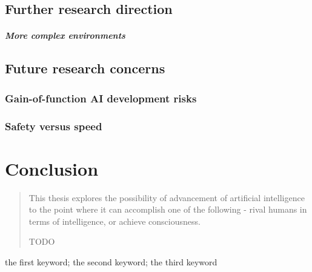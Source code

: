 \documentclass[masterthesis]{fer}
\begin{document}
\section{Further research direction}
\paragraph{More complex environments}
\section{Future research concerns}
\subsection{Gain-of-function AI development risks}

\subsection{Safety versus speed}

\chapter{Conclusion}
\label{chp:conclusion}

\blindtext








\begin{abstract}
  This thesis explores the possibility of advancement of artificial intelligence to the point where it can accomplish one of the following - rival humans in terms of intelligence, or achieve consciousness. 
  
  TODO
\end{abstract}

\begin{keywords}
  the first keyword; the second keyword; the third keyword
\end{keywords}
\end{document}
